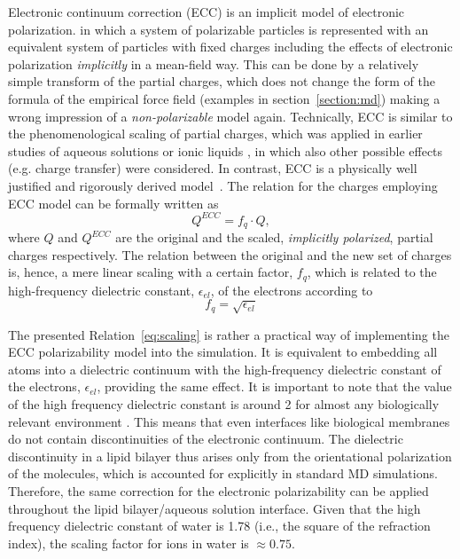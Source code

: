
Electronic continuum correction (ECC) is an implicit model of electronic polarization. 
in which a system of polarizable particles is represented
with an equivalent system of particles with fixed charges
including the effects of electronic polarization \emph{implicitly} in a mean-field way. \citep{leontyev09, leontyev10, leontyev11, leontyev14}
This can be done by a relatively simple transform of the partial charges,
which does not change the form of the formula of the empirical force field (examples in section~\ref{section:md})
making a wrong impression of a \emph{non-polarizable} model again. 
Technically, ECC is similar to the phenomenological scaling of partial charges, 
which was applied in earlier studies of aqueous solutions or ionic liquids \citep{jonsson86,egberts94,beichel14},
in which also other possible effects (e.g. charge transfer) were considered.
In contrast, ECC is a physically well justified and rigorously derived model~\citep{leontyev09, leontyev10, leontyev11, leontyev14}.
The relation for the charges employing ECC model can be formally written as
\begin{equation}  \label{eq:scaling}
 Q^{ECC} = f_q \cdot Q ,
\end{equation} 
where $Q$ and $Q^{ECC}$ are the original and the scaled, \emph{implicitly polarized}, partial charges respectively. 
The relation between the original and the new set of charges 
is, hence, a mere linear scaling with a certain factor, $f_q$, 
which is related to the high-frequency dielectric constant, $\epsilon _{el}$, of the electrons according to
\begin{equation}   \label{eq:scaling_factor}
 f_q = \sqrt{ \epsilon _{el} }
\end{equation} 

The presented Relation~\ref{eq:scaling} is rather a practical way of implementing the ECC polarizability model into the simulation. 
It is equivalent to embedding all atoms into a dielectric continuum 
with the high-frequency dielectric constant of the electrons, $\epsilon _{el}$, providing the same effect.
It is important to note that the value of the high frequency dielectric constant  
is around 2 for almost any biologically relevant environment \citep{leontyev11}. 
This means that even interfaces like biological membranes do not contain discontinuities of the electronic continuum. 
The dielectric discontinuity in a lipid bilayer thus arises only 
from the orientational polarization of the molecules, which is accounted for explicitly in standard MD simulations.  
Therefore, the same correction for the electronic polarizability can be  
applied throughout the lipid bilayer/aqueous solution interface. 
Given that the  high frequency dielectric constant of water is 1.78 (i.e., the square of the refraction index), 
the scaling factor for ions in water is $\approx 0.75$. 





